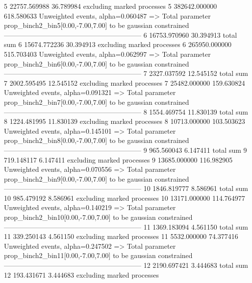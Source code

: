 5          22757.569988    36.789984       excluding marked processes    
5          382642.000000   618.580633      Unweighted events, alpha=0.060487
  => Total parameter prop_binch2_bin5[0.00,-7.00,7.00] to be gaussian constrained
------------------------------------------------------------
6          16753.970960    30.394913       total sum                     
6          15674.772236    30.394913       excluding marked processes    
6          265950.000000   515.703403      Unweighted events, alpha=0.062997
  => Total parameter prop_binch2_bin6[0.00,-7.00,7.00] to be gaussian constrained
------------------------------------------------------------
7          2327.037592     12.545152       total sum                     
7          2002.595495     12.545152       excluding marked processes    
7          25482.000000    159.630824      Unweighted events, alpha=0.091321
  => Total parameter prop_binch2_bin7[0.00,-7.00,7.00] to be gaussian constrained
------------------------------------------------------------
8          1554.469754     11.830139       total sum                     
8          1224.481995     11.830139       excluding marked processes    
8          10713.000000    103.503623      Unweighted events, alpha=0.145101
  => Total parameter prop_binch2_bin8[0.00,-7.00,7.00] to be gaussian constrained
------------------------------------------------------------
9          965.560043      6.147411        total sum                     
9          719.148117      6.147411        excluding marked processes    
9          13685.000000    116.982905      Unweighted events, alpha=0.070556
  => Total parameter prop_binch2_bin9[0.00,-7.00,7.00] to be gaussian constrained
------------------------------------------------------------
10         1846.819777     8.586961        total sum                     
10         985.479192      8.586961        excluding marked processes    
10         13171.000000    114.764977      Unweighted events, alpha=0.140219
  => Total parameter prop_binch2_bin10[0.00,-7.00,7.00] to be gaussian constrained
------------------------------------------------------------
11         1369.183094     4.561150        total sum                     
11         339.250143      4.561150        excluding marked processes    
11         5532.000000     74.377416       Unweighted events, alpha=0.247502
  => Total parameter prop_binch2_bin11[0.00,-7.00,7.00] to be gaussian constrained
------------------------------------------------------------
12         2190.697421     3.444683        total sum                     
12         193.431671      3.444683        excluding marked processes    
